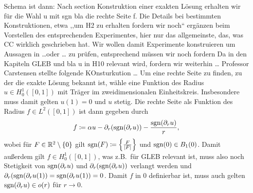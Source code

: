 Schema ist dann: Nach section Konstruktion einer exakten Lösung erhalten wir
für die Wahl u mit sgn bla die rechte Seite f.
Die Details bei bestimmten Konstruktionen, etwa ,,um H2 zu erhalten fordern wir
noch`` ergänzen beim Vorstellen des entsprechenden Experimentes, hier nur das 
allgemeinste, das, was CC wirklich geschrieben hat.
Wir wollen damit Experimente konstruieren um Aussagen in \ldots oder \ldots
zu prüfen, entsprechend müssen wir noch fordern
Da in den Kapiteln GLEB und bla u in H10 relevant wird, fordern wir
weiterhin \ldots
Professor Carstensen stellte folgende KOnsturkution \ldots
Um eine rechte Seite zu finden, zu der die exakte Lösung bekannt
ist, wähle eine Funktion des Radius $u\in H^1_0([0,1])$ mit Träger im 
zweidimensionalen Einheitskreis. Insbesondere muss damit gelten $u(1)=0$ und
$u$ stetig.
Die rechte Seite als Funktion des Radius $f\in L^2([0,1])$ ist dann gegeben
durch 
\begin{align*}
  f \coloneqq 
  \alpha u - \partial_r(\operatorname{sgn}(\partial_r u)) - \frac{\operatorname{sgn}(\partial_r u)}{r},
\end{align*}
wobei für $F\in\mathbb{R}^2\setminus\{0\}$ gilt 
$\operatorname{sgn}(F)\coloneqq \left\{\frac{F}{|F|}\right\}$ 
und $\operatorname{sgn}(0)\in B_1(0)$.
Damit außerdem gilt $f\in H^1_0([0,1])$, was z.B.\ für GLEB relevant ist, 
muss also noch Stetigkeit von $\operatorname{sgn}(\partial_r u)$ und 
$\partial_r(\operatorname{sgn}(\partial_r u))$ verlangt werden und 
$\partial_r(\operatorname{sgn}(\partial_r u(1))=\operatorname{sgn}(\partial_r u(1))=0$.
Damit $f$ in $0$ definierbar ist, muss auch gelten 
$\operatorname{sgn}(\partial_r u) \in o(r)$ für $r\to 0$.

